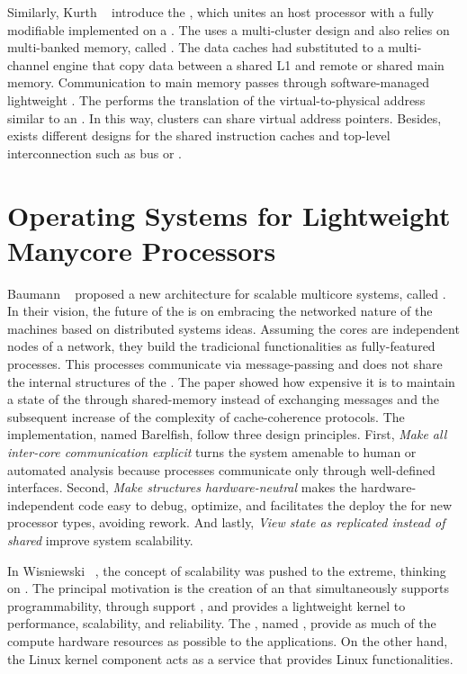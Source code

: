 	Similarly, Kurth \etal~\cite{Kurth2017} introduce the \hero, which unites an \arm
	host processor with a fully modifiable \riscv \manycore implemented on a \fpga.
	The \pmca uses a multi-cluster design and also relies on multi-banked memory, called \spm.
	The data caches had substituted to a multi-channel \dma engine that copy data
	between a shared L1 \spm and remote \spms or shared main memory.
	Communication to main memory passes through software-managed lightweight \rab.
	The \rab performs the translation of the virtual-to-physical address similar to an \mmu.
	In this way, clusters can share virtual address pointers.
	Besides, exists different designs for the shared instruction caches and
	top-level interconnection such as bus or \noc.

\section{Operating Systems for Lightweight Manycore Processors}
\label{sec.works.os}

	Baumann \etal~\cite{Baumann2009} proposed a new \os architecture for scalable multicore
	systems, called \multikernel.
	In their vision, the future of the \oses is on embracing the networked nature
	of the machines based on distributed systems ideas.
	Assuming the cores are independent nodes of a network, they build the tradicional
	\os functionalities as fully-featured processes.
	This processes communicate via message-passing and does not share the internal
	structures of the \os.
	The paper showed how expensive it is to maintain a state of the \os through
	shared-memory instead of exchanging messages and the subsequent increase of
	the complexity of cache-coherence protocols.
	The \multikernel implementation, named Barelfish, follow three design principles.
	First, \textit{Make all inter-core communication explicit} turns the system
	amenable to human or automated analysis because processes communicate only
	through well-defined interfaces.
	Second, \textit{Make \os structures hardware-neutral} makes the hardware-independent
	code easy to debug, optimize, and facilitates the deploy the \os for new
	processor types, avoiding rework.
	And lastly, \textit{View \os state as replicated instead of shared} improve system
	scalability.

	In Wisniewski~\cite{Wisniewski2014} \etal, the concept of scalability was pushed
	to the extreme, thinking on \hpc.
	The principal motivation is the creation of an \os that simultaneously supports
	programmability, through support \linux \api, and provides a lightweight kernel
	to performance, scalability, and reliability.
	The \os, named \mos, provide as much of the compute hardware resources as
	possible to the \hpc applications. On the other hand, the Linux kernel
	component acts as a service that provides Linux functionalities.
	
